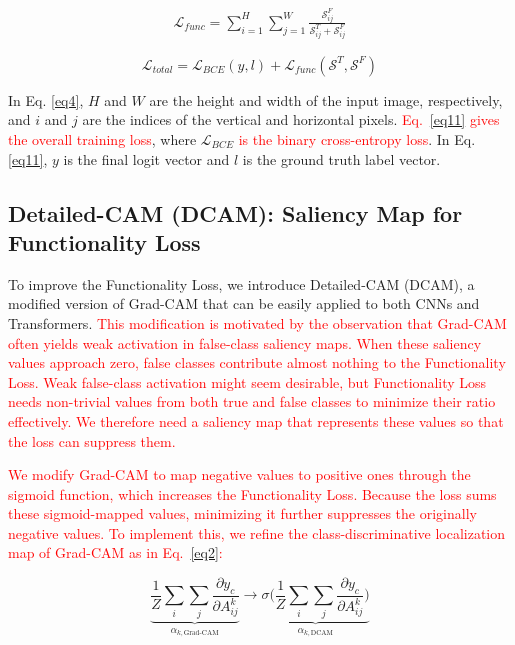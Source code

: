 \documentclass[preprint,7pt, a4paper]{elsarticle}
\begin{document}
\begin{equation}
    \begin{split}
        \mathcal{L}_{func}
        = \sum^{H}_{i=1}\sum^{W}_{j=1}\frac
        {\mathcal{S}^{F}_{ij}}
        {\mathcal{S}^{T}_{ij}+\mathcal{S}^{F}_{ij}}
    \end{split}
\label{eq4}
\end{equation}

\begin{equation}
    \mathcal{L}_{total} = \mathcal{L}_{BCE}(y, l) + \mathcal{L}_{func}(\mathcal{S}^T, \mathcal{S}^F)
    \label{eq11}
\end{equation}

In Eq. \ref{eq4}, $H$ and $W$ are the height and width of the input image, respectively, and $i$ and $j$ are the indices of the vertical and horizontal pixels. \textcolor{red}{Eq.~\ref{eq11} gives the overall training loss}, where $\mathcal{L}_{BCE}$ \textcolor{red}{is the binary cross-entropy loss}. In Eq. \ref{eq11}, $y$ is the final logit vector and $l$ is the ground truth label vector.

\subsection{Detailed-CAM (DCAM): Saliency Map for Functionality Loss}

To improve the Functionality Loss, we introduce Detailed-CAM (DCAM), a modified version of Grad-CAM that can be easily applied to both CNNs and Transformers. \textcolor{red}{This modification is motivated by the observation that Grad-CAM often yields weak activation in false-class saliency maps. When these saliency values approach zero, false classes contribute almost nothing to the Functionality Loss. Weak false-class activation might seem desirable, but Functionality Loss needs non-trivial values from both true and false classes to minimize their ratio effectively. We therefore need a saliency map that represents these values so that the loss can suppress them.}

\textcolor{red}{We modify Grad-CAM to map negative values to positive ones through the sigmoid function, which increases the Functionality Loss. Because the loss sums these sigmoid-mapped values, minimizing it further suppresses the originally negative values. To implement this, we refine the class-discriminative localization map of Grad-CAM as in Eq.~\ref{eq2}:} 


    \begin{equation}
        \underbrace{
            \frac{1}{Z}\sum_{i}\sum_{j}\frac{\partial y_c}{\partial A^{k}_{ij}}
        }_{\alpha_{k,\text{Grad-CAM}}}
        \rightarrow
        \underbrace{
            \sigma\bigg(\frac{1}{Z}\sum_{i}\sum_{j}\frac{\partial y_c}{\partial A^{k}_{ij}}\bigg)
        }_{\alpha_{k,\text{DCAM}}}
    \label{eq2}
    \end{equation}
\end{document}
